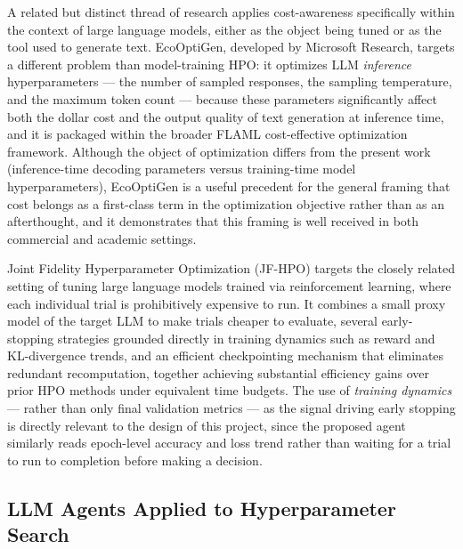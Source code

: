 \documentclass[11pt]{article}
\begin{document}
A related but distinct thread of research applies cost-awareness specifically within the context of large language models, either as the object being tuned or as the tool used to generate text. EcoOptiGen, developed by Microsoft Research, targets a different problem than model-training HPO: it optimizes LLM \emph{inference} hyperparameters --- the number of sampled responses, the sampling temperature, and the maximum token count --- because these parameters significantly affect both the dollar cost and the output quality of text generation at inference time, and it is packaged within the broader FLAML cost-effective optimization framework. Although the object of optimization differs from the present work (inference-time decoding parameters versus training-time model hyperparameters), EcoOptiGen is a useful precedent for the general framing that cost belongs as a first-class term in the optimization objective rather than as an afterthought, and it demonstrates that this framing is well received in both commercial and academic settings.

Joint Fidelity Hyperparameter Optimization (JF-HPO) targets the closely related setting of tuning large language models trained via reinforcement learning, where each individual trial is prohibitively expensive to run. It combines a small proxy model of the target LLM to make trials cheaper to evaluate, several early-stopping strategies grounded directly in training dynamics such as reward and KL-divergence trends, and an efficient checkpointing mechanism that eliminates redundant recomputation, together achieving substantial efficiency gains over prior HPO methods under equivalent time budgets. The use of \emph{training dynamics} --- rather than only final validation metrics --- as the signal driving early stopping is directly relevant to the design of this project, since the proposed agent similarly reads epoch-level accuracy and loss trend rather than waiting for a trial to run to completion before making a decision.

\subsection{LLM Agents Applied to Hyperparameter Search}
\end{document}
